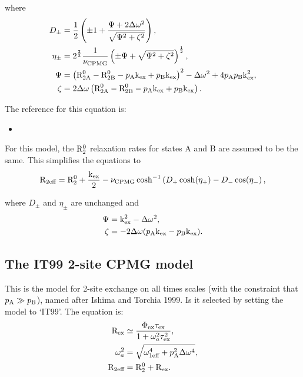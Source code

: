 where
\begin{align}
    D_\pm    &= \frac{1}{2} \left( \pm1 + \frac{\Psi + 2\Delta\omega^2}{\sqrt{\Psi^2 + \zeta^2}} \right) , \\
    \eta_\pm &= 2^{\frac{2}{3}}\frac{1}{\nu_\textrm{CPMG}} \left( \pm\Psi + \sqrt{\Psi^2 + \zeta^2} \right)^{\frac{1}{2}} , \\
    \Psi     &= \left( \textrm{R}_\textrm{2A}^0 - \textrm{R}_\textrm{2B}^0 - p_\textrm{A}\textrm{k}_\textrm{ex} + p_\textrm{B}\textrm{k}_\textrm{ex} \right)^2 - \Delta\omega^2 + 4p_\textrm{A}p_\textrm{B}\textrm{k}_\textrm{ex}^2 , \\
    \zeta    &= 2\Delta\omega \left( \textrm{R}_\textrm{2A}^0 - \textrm{R}_\textrm{2B}^0 - p_\textrm{A}\textrm{k}_\textrm{ex} + p_\textrm{B}\textrm{k}_\textrm{ex} \right).
\end{align}

The reference for this equation is:
\begin{itemize}
\item {}
\end{itemize}

For this model, the $\mathrm{R}_2^0$ relaxation rates for states A and B are assumed to be the same.  This simplifies the equations to
\begin{equation}
    \mathrm{R}_{2\textrm{eff}} = \mathrm{R}_2^0 + \frac{\textrm{k}_\textrm{ex}}{2} - \nu_\textrm{CPMG}\cosh^{-1} \left( D_+\cosh(\eta_+) - D_-\cos(\eta_- \right) ,
\end{equation}

where $D_\pm$ and $\eta_\pm$ are unchanged and
\begin{align}
    \Psi  &= \textrm{k}_\textrm{ex}^2 - \Delta\omega^2 , \\
    \zeta &= -2\Delta\omega (p_\textrm{A}\textrm{k}_\textrm{ex} - p_\textrm{B}\textrm{k}_\textrm{ex}) .
\end{align}




\subsection{The IT99 2-site CPMG model}

This is the model for 2-site exchange on all times scales (with the constraint that $p_\textrm{A} \gg p_\textrm{B}$), named after Ishima and Torchia 1999.  Is it selected by setting the model to `IT99'.  The equation is:
\begin{align}
    \mathrm{R}_\textrm{ex}       &\simeq \frac{\Phi_\textrm{ex}\tau_\textrm{ex}}{1 + \omega_a^2\tau_\textrm{ex}^2} , \\
    \omega_a^2 &= \sqrt{\omega_\textrm{1eff}^4 + p_\textrm{A}^2\Delta\omega^4} , \\
    \mathrm{R}_{2\textrm{eff}}   &= \mathrm{R}_2^0 + \mathrm{R}_\textrm{ex} .
\end{align}

